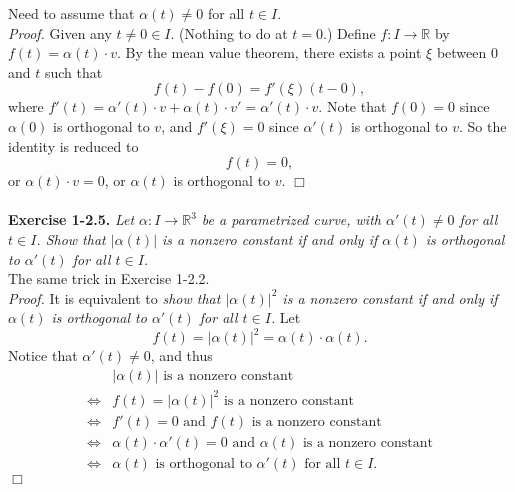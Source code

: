 \documentclass{article}
\begin{document}
Need to assume that $\alpha(t) \neq 0$ for all $t \in I$. \\

\emph{Proof.}
Given any $t \neq 0 \in I$. (Nothing to do at $t = 0$.)
Define $f: I \to \mathbb{R}$ by $f(t) = \alpha(t) \cdot v$.
By the mean value theorem, there exists a point $\xi$ between $0$ and $t$
such that
$$f(t) - f(0) = f'(\xi)(t - 0),$$
where $f'(t) = \alpha'(t) \cdot v + \alpha(t) \cdot v' = \alpha'(t) \cdot v$.
Note that $f(0) = 0$ since $\alpha(0)$ is orthogonal to $v$,
and $f'(\xi) = 0$ since $\alpha'(t)$ is orthogonal to $v$.
So the identity is reduced to
$$f(t) = 0,$$
or $\alpha(t) \cdot v = 0$,
or $\alpha(t)$ is orthogonal to $v$.
$\Box$ \\\\






\textbf{Exercise 1-2.5.}
\emph{Let $\alpha: I \to \mathbb{R}^3$ be a parametrized curve,
with $\alpha'(t) \neq 0$ for all $t \in I$.
Show that $|\alpha(t)|$ is a nonzero constant
if and only if
$\alpha(t)$ is orthogonal to $\alpha'(t)$ for all $t \in I$.} \\

The same trick in Exercise 1-2.2. \\

\emph{Proof.}
It is equivalent to
\emph{show that $|\alpha(t)|^2$ is a nonzero constant
if and only if
$\alpha(t)$ is orthogonal to $\alpha'(t)$ for all $t \in I$.}
Let $$f(t) = |\alpha(t)|^2 = \alpha(t) \cdot \alpha(t).$$
Notice that $\alpha'(t) \neq 0$, and thus
\begin{align*}
&|\alpha(t)| \text{ is a nonzero constant} \\
\Longleftrightarrow&
f(t) = |\alpha(t)|^2 \text{ is a nonzero constant} \\
\Longleftrightarrow&
f'(t) = 0 \text{ and } f(t) \text{ is a nonzero constant} \\
\Longleftrightarrow&
\alpha(t) \cdot \alpha'(t) = 0 \text{ and } \alpha(t) \text{ is a nonzero constant} \\
\Longleftrightarrow&
\alpha(t) \text{ is orthogonal to } \alpha'(t) \text{ for all } t \in I.
\end{align*}
$\Box$ \\\\
\end{document}
